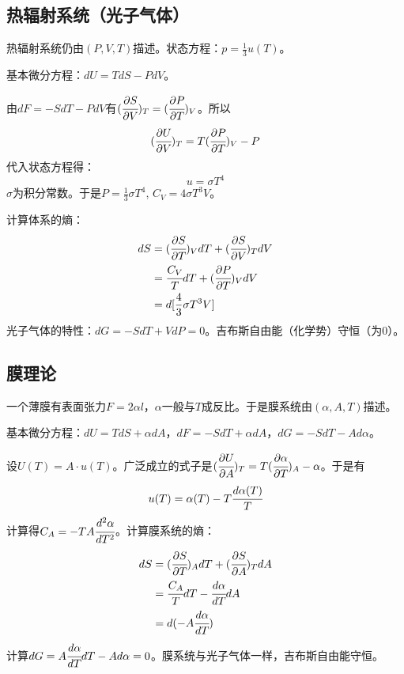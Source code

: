 \documentclass[a4paper,12pt]{article}
\newcommand{\myp}[3]{(\cfrac{\partial{#1}}{\partial{#2}})_{#3}}
\begin{document}
\subsection{热辐射系统（光子气体）}
热辐射系统仍由$(P,V,T)$描述。状态方程：$p = \frac{1}{3}u(T)$。\par
基本微分方程：$dU = TdS - PdV$。\par
由$dF = -SdT - PdV$有$\myp{S}{V}{T} = \myp{P}{T}{V}$。所以
\begin{equation}
\myp{U}{V}{T} = T\myp{P}{T}{V} - P
\end{equation}
代入状态方程得：
\begin{equation}
u = \sigma T^4
\end{equation}
$\sigma$为积分常数。于是$P = \frac{1}{3}\sigma T^4$, $C_V = 4 \sigma T^3 V$。\par
计算体系的熵：
\begin{subequations}
\begin{align*}
dS &= \myp{S}{T}{V}dT + \myp{S}{V}{T} dV \\
   &= \cfrac{C_V}{T}dT + \myp{P}{T}{V}dV \\
   & = d[\frac{4}{3}\sigma T^3 V] \\
\end{align*}
\end{subequations}
\indent 光子气体的特性：$dG = -SdT + VdP = 0$。吉布斯自由能（化学势）守恒（为$0$）。




\subsection{膜理论}
一个薄膜有表面张力$F = 2 \alpha l$，$\alpha$一般与$T$成反比。于是膜系统由$(\alpha, A, T)$描述。\par
基本微分方程：$dU = TdS + \alpha dA$，$dF = -SdT + \alpha dA$，$dG = -SdT - Ad\alpha$。\par
设$U(T) = A \cdot u(T)$。广泛成立的式子是$\myp{U}{A}{T} = T\myp{\alpha}{T}{A} - \alpha$。于是有
\begin{equation}
u(T) = \alpha(T) - T\cfrac{d\alpha(T)}{T}
\end{equation}
计算得$C_A = -TA\cfrac{d^2\alpha}{dT^2}$。计算膜系统的熵：
\begin{subequations}
\begin{align*}
dS &= \myp{S}{T}{A}dT + \myp{S}{A}{T} dA \\
   &= \cfrac{C_A}{T}dT - \cfrac{d\alpha}{dT}dA \\
   &= d(- A \cfrac{d\alpha}{dT}) \\
\end{align*}
\end{subequations}
计算$dG = A \cfrac{d\alpha}{dT} dT - A d\alpha = 0$。膜系统与光子气体一样，吉布斯自由能守恒。
\end{document}

